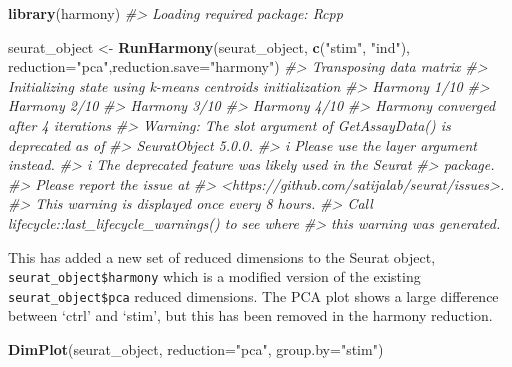 \documentclass[
]{book}
\newenvironment{Shaded}{\begin{snugshade}}{\end{snugshade}}
\newcommand{\AttributeTok}[1]{\textcolor[rgb]{0.13,0.29,0.53}{#1}}
\newcommand{\CommentTok}[1]{\textcolor[rgb]{0.56,0.35,0.01}{\textit{#1}}}
\newcommand{\FunctionTok}[1]{\textcolor[rgb]{0.13,0.29,0.53}{\textbf{#1}}}
\newcommand{\NormalTok}[1]{#1}
\newcommand{\OtherTok}[1]{\textcolor[rgb]{0.56,0.35,0.01}{#1}}
\newcommand{\StringTok}[1]{\textcolor[rgb]{0.31,0.60,0.02}{#1}}
\begin{document}
\begin{Shaded}
\begin{Highlighting}[]
\FunctionTok{library}\NormalTok{(harmony)}
\CommentTok{\#\textgreater{} Loading required package: Rcpp}

\NormalTok{seurat\_object }\OtherTok{\textless{}{-}} \FunctionTok{RunHarmony}\NormalTok{(seurat\_object, }\FunctionTok{c}\NormalTok{(}\StringTok{"stim"}\NormalTok{, }\StringTok{"ind"}\NormalTok{), }\AttributeTok{reduction=}\StringTok{"pca"}\NormalTok{,}\AttributeTok{reduction.save=}\StringTok{"harmony"}\NormalTok{)}
\CommentTok{\#\textgreater{} Transposing data matrix}
\CommentTok{\#\textgreater{} Initializing state using k{-}means centroids initialization}
\CommentTok{\#\textgreater{} Harmony 1/10}
\CommentTok{\#\textgreater{} Harmony 2/10}
\CommentTok{\#\textgreater{} Harmony 3/10}
\CommentTok{\#\textgreater{} Harmony 4/10}
\CommentTok{\#\textgreater{} Harmony converged after 4 iterations}
\CommentTok{\#\textgreater{} Warning: The \textasciigrave{}slot\textasciigrave{} argument of \textasciigrave{}GetAssayData()\textasciigrave{} is deprecated as of}
\CommentTok{\#\textgreater{} SeuratObject 5.0.0.}
\CommentTok{\#\textgreater{} i Please use the \textasciigrave{}layer\textasciigrave{} argument instead.}
\CommentTok{\#\textgreater{} i The deprecated feature was likely used in the Seurat}
\CommentTok{\#\textgreater{}   package.}
\CommentTok{\#\textgreater{}   Please report the issue at}
\CommentTok{\#\textgreater{}   \textless{}https://github.com/satijalab/seurat/issues\textgreater{}.}
\CommentTok{\#\textgreater{} This warning is displayed once every 8 hours.}
\CommentTok{\#\textgreater{} Call \textasciigrave{}lifecycle::last\_lifecycle\_warnings()\textasciigrave{} to see where}
\CommentTok{\#\textgreater{} this warning was generated.}
\end{Highlighting}
\end{Shaded}

This has added a new set of reduced dimensions to the Seurat object, \texttt{seurat\_object\$harmony} which is a modified version of the existing \texttt{seurat\_object\$pca} reduced dimensions. The PCA plot shows a large difference between `ctrl' and `stim', but this has been removed in the harmony reduction.

\begin{Shaded}
\begin{Highlighting}[]
\FunctionTok{DimPlot}\NormalTok{(seurat\_object, }\AttributeTok{reduction=}\StringTok{"pca"}\NormalTok{, }\AttributeTok{group.by=}\StringTok{"stim"}\NormalTok{)}
\end{Highlighting}
\end{Shaded}
\end{document}
